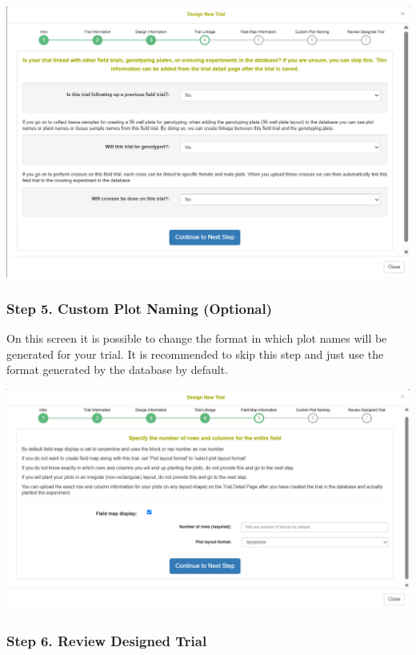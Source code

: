 \documentclass[
  12pt,
]{book}
\begin{document}
\begin{center}\includegraphics[width=0.95\linewidth]{assets/images/trial_create_form_4} \end{center}

\hypertarget{step-5.-custom-plot-naming-optional}{%
\subsubsection*{Step 5. Custom Plot Naming (Optional)}\label{step-5.-custom-plot-naming-optional}}


On this screen it is possible to change the format in which plot names will be generated for your trial. It is recommended to skip this step and just use the format generated by the database by default.

\begin{center}\includegraphics[width=0.95\linewidth]{assets/images/trial_create_form_5} \end{center}

\hypertarget{step-6.-review-designed-trial}{%
\subsubsection*{Step 6. Review Designed Trial}\label{step-6.-review-designed-trial}}
\end{document}
